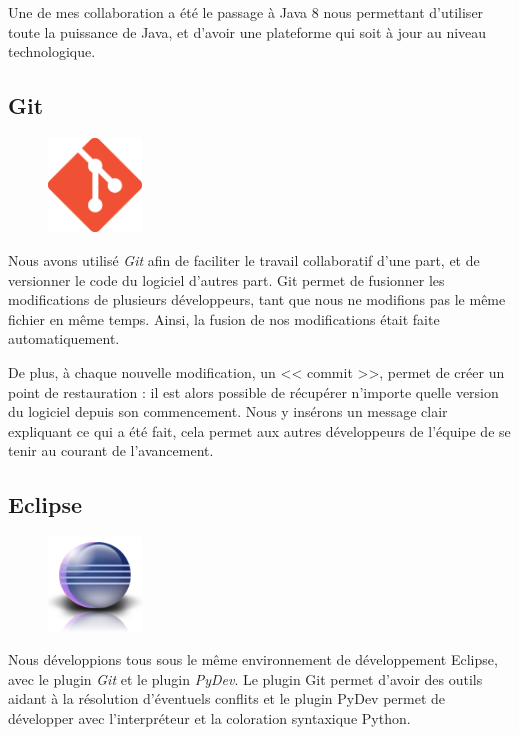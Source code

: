 Une de mes collaboration a été le passage à Java 8 nous permettant d'utiliser toute la puissance de Java, et d'avoir une plateforme qui soit à jour au niveau technologique.

\subsection{Git}
\begin{figure}
\vspace{-15px}
	\includegraphics[width=2.5cm]{contents/images/logoGit.png}
\end{figure}
Nous avons utilisé \textit{Git} afin de faciliter le travail collaboratif d'une part, et de versionner le code du logiciel d'autres part. Git permet de fusionner les
modifications de plusieurs développeurs, tant que nous ne modifions pas le même fichier en même temps. Ainsi, la fusion de nos modifications était faite automatiquement. 

De plus, à chaque nouvelle modification, un << commit >>, permet de créer un point de restauration : il est alors possible de
récupérer n'importe quelle version du logiciel depuis son commencement. Nous y insérons un message clair expliquant ce qui a été fait, cela permet aux autres développeurs de l'équipe de se tenir au courant de l'avancement.

\subsection{Eclipse}
\begin{figure}
\vspace{-30px}
	\includegraphics[width=2.5cm]{contents/images/logoEclipse.png}
\end{figure}
Nous développions tous sous le même environnement de développement Eclipse, avec le plugin \textit{Git} et le plugin \textit{PyDev}. Le
plugin Git permet d'avoir des outils aidant à la résolution d'éventuels conflits et le plugin PyDev permet de développer avec l'interpréteur
et la coloration syntaxique Python. 

